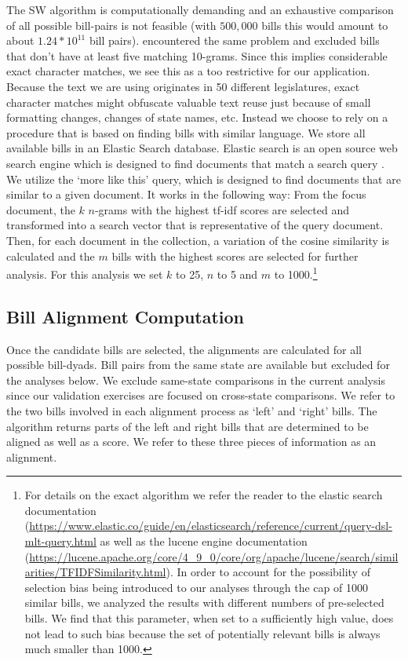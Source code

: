 \documentclass[12pt]{article} %
\begin{document}
The SW algorithm is computationally demanding and an exhaustive comparison of
all possible bill-pairs is not feasible (with $500,000$ bills this would amount
to about $1.24 * 10^{11}$ bill pairs). \citet{wilkerson2015tracing} encountered the same problem and excluded bills that don't have at least five matching 10-grams. Since this implies considerable exact character matches, we see this as a too restrictive for our application. Because the text we are using originates in 50 different legislatures, exact character matches might obfuscate valuable text reuse just because of small formatting changes, changes of state names, etc. 
Instead we choose to rely on a procedure that is based on finding bills with
similar language. We store all available bills in an Elastic Search database.
Elastic search is an open source web search engine which is designed to find
documents that match a search query \citep{gormley2015elasticsearch}. We utilize
the `more like this' query, which is designed to find documents that are similar
to a given document. It works in the following way: From the focus document, the
$k$ $n$-grams with the highest tf-idf scores are selected and transformed into a
search vector that is representative of the query document. Then, for each
document in the collection, a variation of the cosine similarity is calculated
and the $m$ bills with the highest scores are selected for further analysis. For
this analysis we set $k$ to 25, $n$ to 5 and $m$ to 1000.\footnote{For
details on the exact algorithm we refer the reader to the elastic search
documentation
(\url{https://www.elastic.co/guide/en/elasticsearch/reference/current/query-dsl-mlt-query.html} as well as the lucene engine
documentation
(\url{https://lucene.apache.org/core/4_9_0/core/org/apache/lucene/search/similarities/TFIDFSimilarity.html}).
In order to account for the possibility of selection bias being introduced to
our analyses through the cap of 1000 similar bills, we analyzed the results with
different numbers of pre-selected bills. We find that this parameter, when set
to a sufficiently high value, does not lead to such bias because the set of
potentially relevant bills is always much smaller than 1000.}


\subsection{Bill Alignment Computation}

Once the candidate bills are selected, the alignments are calculated for all
possible bill-dyads. Bill pairs from the same state are available but excluded
for the analyses below. We exclude same-state comparisons in the current
analysis since our validation exercises are focused on cross-state comparisons.
We refer to the two bills involved in each alignment process as `left' and
`right' bills. The algorithm returns parts of the left and right bills that are determined to be aligned as well as a score. We refer to these three pieces of information as an alignment. 
\end{document}
